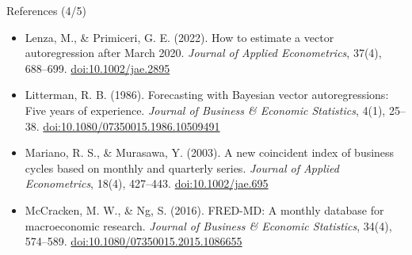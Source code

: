 \begin{frame}{References (4/5)}
\begin{itemize}
    \item Lenza, M., \& Primiceri, G. E. (2022). How to estimate a vector autoregression after March 2020. \textit{Journal of Applied Econometrics}, 37(4), 688--699. \href{https://doi.org/10.1002/jae.2895}{doi:10.1002/jae.2895}
    \item Litterman, R. B. (1986). Forecasting with Bayesian vector autoregressions: Five years of experience. \textit{Journal of Business \& Economic Statistics}, 4(1), 25--38. \href{https://doi.org/10.1080/07350015.1986.10509491}{doi:10.1080/07350015.1986.10509491}
    \item Mariano, R. S., \& Murasawa, Y. (2003). A new coincident index of business cycles based on monthly and quarterly series. \textit{Journal of Applied Econometrics}, 18(4), 427--443. \href{https://doi.org/10.1002/jae.695}{doi:10.1002/jae.695}
    \item McCracken, M. W., \& Ng, S. (2016). FRED-MD: A monthly database for macroeconomic research. \textit{Journal of Business \& Economic Statistics}, 34(4), 574--589. \href{https://doi.org/10.1080/07350015.2015.1086655}{doi:10.1080/07350015.2015.1086655}
\end{itemize}
\end{frame}

